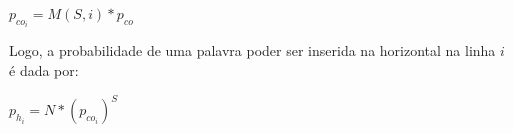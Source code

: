 \begin{center}
    \Large{$p_{co_{i}} = M(S,i)*p_{co}$}
\end{center}

Logo, a probabilidade de uma palavra poder ser inserida na horizontal na linha $i$ é dada por:

\begin{center}
    \Large{$p_{h_{i}} = N*(p_{co_{i}})^{S}$}
\end{center}



